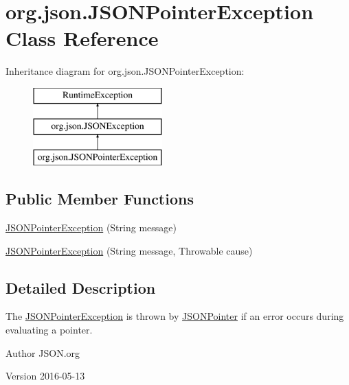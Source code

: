 \hypertarget{classorg_1_1json_1_1JSONPointerException}{\section{org.\-json.\-J\-S\-O\-N\-Pointer\-Exception Class Reference}
\label{classorg_1_1json_1_1JSONPointerException}
}
Inheritance diagram for org.\-json.\-J\-S\-O\-N\-Pointer\-Exception\-:\begin{figure}[H]
\begin{center}
\leavevmode
\includegraphics[height=3.000000cm]{classorg_1_1json_1_1JSONPointerException}
\end{center}
\end{figure}
\subsection*{Public Member Functions}
\begin{DoxyCompactItemize}
\item 
\hyperlink{classorg_1_1json_1_1JSONPointerException_a40c9016543b1a2a8c6acd0a26e408ae8}{J\-S\-O\-N\-Pointer\-Exception} (String message)
\item 
\hyperlink{classorg_1_1json_1_1JSONPointerException_a0607a3e0ff2baa49734981af31b92c06}{J\-S\-O\-N\-Pointer\-Exception} (String message, Throwable cause)
\end{DoxyCompactItemize}


\subsection{Detailed Description}
The \hyperlink{classorg_1_1json_1_1JSONPointerException}{J\-S\-O\-N\-Pointer\-Exception} is thrown by \hyperlink{classorg_1_1json_1_1JSONPointer}{J\-S\-O\-N\-Pointer} if an error occurs during evaluating a pointer.

\begin{DoxyAuthor}{Author}
J\-S\-O\-N.\-org 
\end{DoxyAuthor}
\begin{DoxyVersion}{Version}
2016-\/05-\/13 
\end{DoxyVersion}


